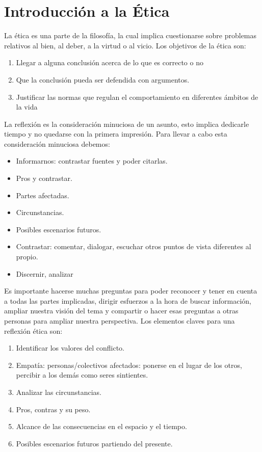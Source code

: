 
\section{Introducción a la Ética}
La ética es una parte de la filosofía, la cual implica cuestionarse sobre problemas relativos al bien, al deber, a la virtud o al vicio.
Los objetivos de la ética son:
\begin{enumerate}
    \item Llegar a alguna conclusión acerca de lo que es correcto o no
    \item Que la conclusión pueda ser defendida con argumentos.
    \item Justificar las normas que regulan el comportamiento en diferentes ámbitos de la vida
\end{enumerate}


La reflexión es la consideración minuciosa de un asunto, esto implica dedicarle tiempo y no quedarse con la primera impresión. Para llevar a cabo esta consideración minuciosa debemos:
\begin{itemize}
    \item Informarnos: contrastar fuentes y poder citarlas.
    \item Pros y contrastar.
    \item Partes afectadas.
    \item Circunstancias.
    \item Posibles escenarios futuros.
    \item Contrastar: comentar, dialogar, escuchar otros puntos de vista diferentes al propio.
    \item Discernir, analizar
\end{itemize}

Es importante hacerse muchas preguntas para poder reconocer y tener en cuenta a todas las partes implicadas, dirigir esfuerzos a la hora de buscar información, ampliar nuestra visión del tema y compartir o hacer esas preguntas a otras personas para ampliar nuestra perspectiva.
Los elementos claves para una reflexión ética son:
\begin{enumerate}
    \item Identificar los valores del conflicto.
    \item Empatía: personas/colectivos afectados: ponerse en el lugar de los otros, percibir a los demás como seres sintientes.
    \item Analizar las circunstancias.
    \item Pros, contras y su peso.
    \item Alcance de las consecuencias en el espacio y el tiempo.
    \item Posibles escenarios futuros partiendo del presente.
\end{enumerate}

